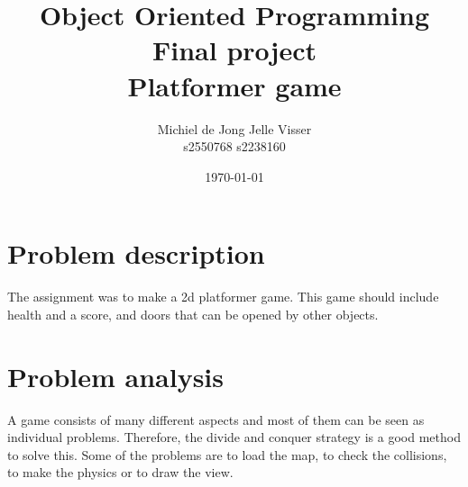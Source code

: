 \documentclass[a4paper]{article}
\begin{document}


\title{Object Oriented Programming\\
Final project \\
Platformer game
}

\date{\today}

\author{Michiel de Jong \quad Jelle Visser\\
s2550768 \quad s2238160
}

\maketitle

\section{Problem description}
The assignment was to make a 2d platformer game. This game should include health and a score, and doors that can be opened by other objects.

\section{Problem analysis}
A game consists of many different aspects and most of them can be seen as individual problems.
Therefore, the divide and conquer strategy is a good method to solve this.
Some of the problems are to load the map, to check the collisions, to make the physics or to draw the view.
\end{document}
